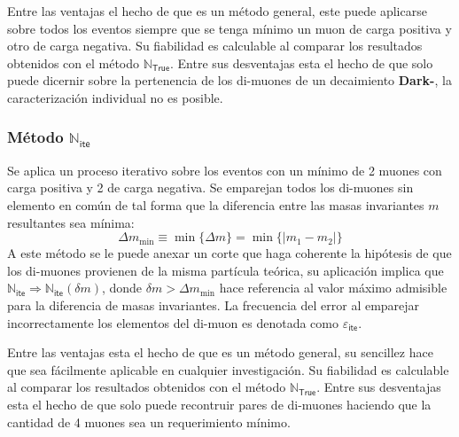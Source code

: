 Entre las ventajas el hecho de que es un método general, este puede aplicarse sobre todos los eventos siempre que se tenga mínimo un muon de carga positiva y otro de carga negativa. Su fiabilidad es calculable al comparar los resultados obtenidos con el método $\mathbb{N}_\textsf{True}$. Entre sus desventajas esta el hecho de que solo puede dicernir sobre la pertenencia de los di-muones de un decaimiento \textbf{Dark-}\SUSY, la caracterización individual no es posible.


\subsubsection{Método $\mathbb{N}_\textsf{ite}$}
 
Se aplica un proceso iterativo sobre los eventos con un mínimo de 2 muones con carga positiva y 2 de carga negativa. Se emparejan todos los di-muones sin elemento en común de tal forma que la diferencia entre las masas invariantes $m$ resultantes sea mínima:
\begin{equation}
\Delta m_{\min} \equiv \min{\{\Delta m\}}  = \min{\{|m_1-m_2|\}}
\end{equation}
A este método se le puede anexar un corte que haga coherente la hipótesis de que los di-muones provienen de la misma partícula teórica, su aplicación implica que $\mathbb{N}_\textsf{ite} \Rightarrow \mathbb{N}_\textsf{ite}(\delta m)$, donde $\delta m > \Delta m_{\min}$ hace referencia al valor máximo admisible para la diferencia de masas invariantes. La frecuencia del error al emparejar incorrectamente los elementos del di-muon es denotada como $\varepsilon_\textsf{ite}$.

Entre las ventajas esta el hecho de que es un método general, su sencillez hace que sea fácilmente aplicable en cualquier investigación. Su fiabilidad es calculable al comparar los resultados obtenidos con el método $\mathbb{N}_\textsf{True}$. Entre sus desventajas esta el hecho de que solo puede recontruir pares de di-muones haciendo que la cantidad de 4 muones sea un requerimiento mínimo.















